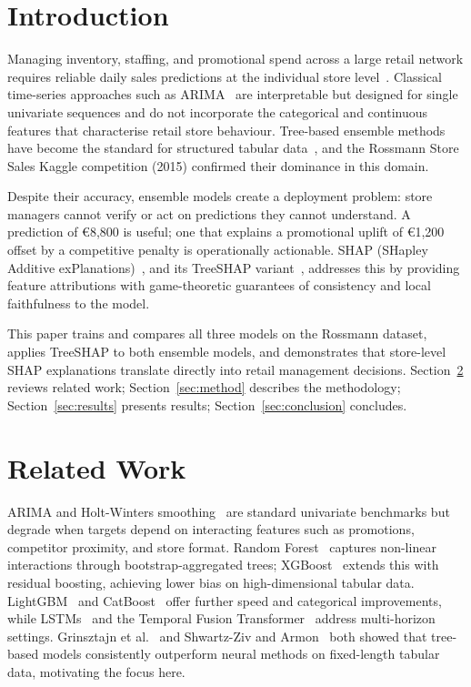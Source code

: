 \documentclass[conference]{IEEEtran}
\begin{document}
\section{Introduction}

Managing inventory, staffing, and promotional spend across a large retail network requires reliable daily sales predictions at the individual store level~\cite{hyndman2021}. Classical time-series approaches such as ARIMA~\cite{box1994} are interpretable but designed for single univariate sequences and do not incorporate the categorical and continuous features that characterise retail store behaviour. Tree-based ensemble methods have become the standard for structured tabular data~\cite{grinsztajn2022}, and the Rossmann Store Sales Kaggle competition (2015) confirmed their dominance in this domain.

Despite their accuracy, ensemble models create a deployment problem: store managers cannot verify or act on predictions they cannot understand. A prediction of \euro8,800 is useful; one that explains a promotional uplift of \euro1,200 offset by a competitive penalty is operationally actionable. SHAP (SHapley Additive exPlanations)~\cite{lundberg2017}, and its TreeSHAP variant~\cite{lundberg2020}, addresses this by providing feature attributions with game-theoretic guarantees of consistency and local faithfulness to the model.

This paper trains and compares all three models on the Rossmann dataset, applies TreeSHAP to both ensemble models, and demonstrates that store-level SHAP explanations translate directly into retail management decisions. Section~\ref{sec:related} reviews related work; Section~\ref{sec:method} describes the methodology; Section~\ref{sec:results} presents results; Section~\ref{sec:conclusion} concludes.

\section{Related Work}
\label{sec:related}

ARIMA and Holt-Winters smoothing~\cite{box1994} are standard univariate benchmarks but degrade when targets depend on interacting features such as promotions, competitor proximity, and store format. Random Forest~\cite{breiman2001} captures non-linear interactions through bootstrap-aggregated trees; XGBoost~\cite{chen2016} extends this with residual boosting, achieving lower bias on high-dimensional tabular data. LightGBM~\cite{ke2017} and CatBoost~\cite{prokhorenkova2018} offer further speed and categorical improvements, while LSTMs~\cite{hochreiter1997} and the Temporal Fusion Transformer~\cite{lim2021} address multi-horizon settings. Grinsztajn et al.~\cite{grinsztajn2022} and Shwartz-Ziv and Armon~\cite{shwartz2022} both showed that tree-based models consistently outperform neural methods on fixed-length tabular data, motivating the focus here.
\end{document}
